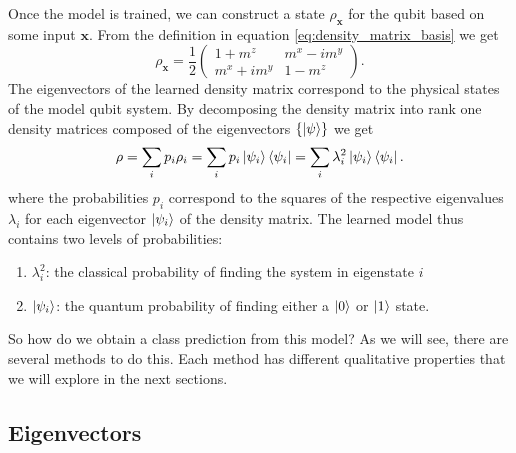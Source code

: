 Once the model is trained, we can construct a state $\rho_\mathbf{x}$ for the qubit based on some input $\mathbf{x}$. From the definition in equation \ref{eq:density_matrix_basis} we get
\begin{equation*}
        \rho_\mathbf{x} = \frac{1}{2}\begin{pmatrix}
           1 + m^z  & m^x - im^y\\
           m^x + im^y      & 1 - m^z          
        \end{pmatrix}.
\end{equation*}
The eigenvectors of the learned density matrix correspond to the physical states of the model qubit system. By decomposing the density matrix into rank one density matrices composed of the eigenvectors $\{\ket{\psi}\}$ we get
\begin{equation}
    \rho = \sum_i p_i \rho_i = \sum_i p_i \ket{\psi_i}\bra{\psi_i} = \sum_i \lambda^2_i \ket{\psi_i}\bra{\psi_i}.
    \label{eq:density_matrix_lambdas}
\end{equation}
where the probabilities $p_i$ correspond to the squares of the respective eigenvalues $\lambda_i$ for each eigenvector $\ket{\psi_i}$ of the density matrix. The learned model thus contains two levels of probabilities:
\begin{enumerate}
    \item $\lambda_i^2$: the classical probability of finding the system in eigenstate $i$
    \item $\ket{\psi_i}$: the quantum probability of finding either a $\ket{0}$ or $\ket{1}$ state.
\end{enumerate}
So how do we obtain a class prediction from this model? As we will see, there are several methods to do this. Each method has different qualitative properties that we will explore in the next sections.

\subsection{Eigenvectors \label{sec:probs}}


